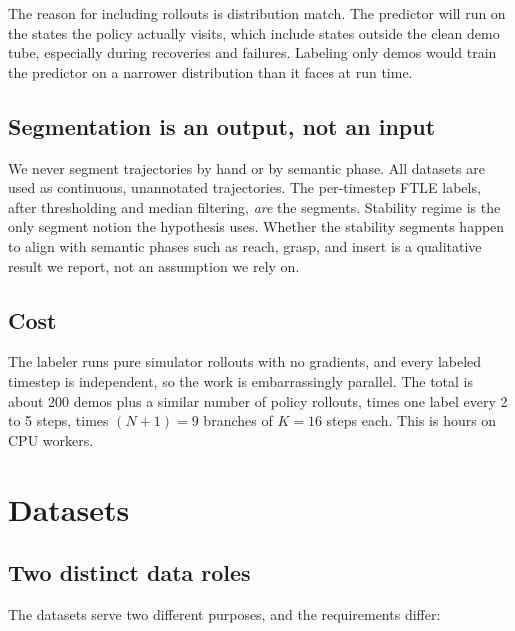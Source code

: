 \documentclass[11pt]{article}
\begin{document}
The reason for including rollouts is distribution match. The predictor will run on the
states the policy actually visits, which include states outside the clean demo tube,
especially during recoveries and failures. Labeling only demos would train the predictor
on a narrower distribution than it faces at run time.

\subsection{Segmentation is an output, not an input}

We never segment trajectories by hand or by semantic phase. All datasets are used as
continuous, unannotated trajectories. The per-timestep FTLE labels, after thresholding
and median filtering, \emph{are} the segments. Stability regime is the only segment
notion the hypothesis uses. Whether the stability segments happen to align with semantic
phases such as reach, grasp, and insert is a qualitative result we report, not an
assumption we rely on.

\subsection{Cost}

The labeler runs pure simulator rollouts with no gradients, and every labeled timestep
is independent, so the work is embarrassingly parallel. The total is about 200 demos
plus a similar number of policy rollouts, times one label every 2 to 5 steps, times
$(N+1) = 9$ branches of $K = 16$ steps each. This is hours on CPU workers.

\section{Datasets}
\label{sec:datasets}

\subsection{Two distinct data roles}

The datasets serve two different purposes, and the requirements differ:
\end{document}
